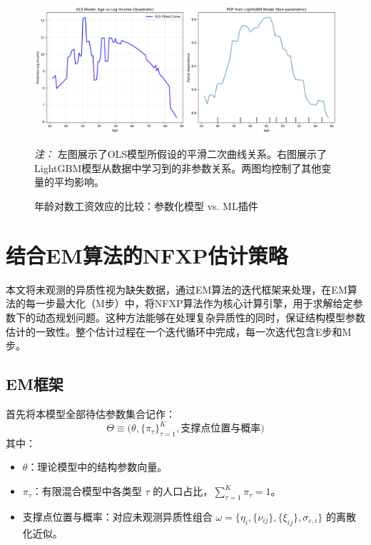 \documentclass[
  a4paper,
  zihao=-4,
  fontset=mac,
  AutoFakeBold,
  AutoFakeSlant,
  oneside]{ctexbook}
\begin{document}
\begin{figure}[!ht]
\centering
\includegraphics[width=\textwidth]{../results/ml_comparison/age_partial_dependence_plot.png} %
\caption{年龄对数工资效应的比较：参数化模型 vs. ML插件}
\label{fig:pdp_comparison}
\vspace{1em}
\begin{minipage}{\linewidth}
\small
\textit{注：} 左图展示了OLS模型所假设的平滑二次曲线关系。右图展示了LightGBM模型从数据中学习到的非参数关系。两图均控制了其他变量的平均影响。
\end{minipage}
\end{figure}



\section{结合EM算法的NFXP估计策略}

本文将未观测的异质性视为缺失数据，通过EM算法的迭代框架来处理，在EM算法的每一步最大化（M步）中，将NFXP算法作为核心计算引擎，用于求解给定参数下的动态规划问题。这种方法能够在处理复杂异质性的同时，保证结构模型参数估计的一致性。整个估计过程在一个迭代循环中完成，每一次迭代包含E步和M步。

\subsection{EM框架}

首先将本模型全部待估参数集合记作：
$$
\Theta \equiv \big(\theta, \{\pi_\tau\}_{\tau=1}^K, \text{支撑点位置与概率}\big)
$$
其中：
\begin{itemize}
    \item $\theta$：理论模型中的结构参数向量。
    \item $\pi_\tau$：有限混合模型中各类型 $\tau$ 的人口占比，$\sum_{\tau=1}^K \pi_\tau = 1$。
    \item 支撑点位置与概率：对应未观测异质性组合 $\omega = \{\eta_i, \{\nu_{ij}\}, \{\xi_{ij}\}, \sigma_{\varepsilon,i}\}$ 的离散化近似。
\end{itemize}
\end{document}

